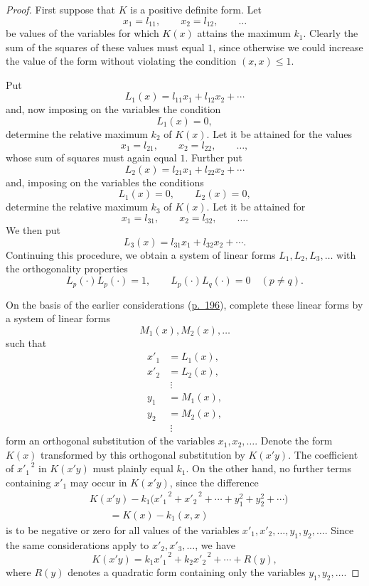 \documentclass[b5paper,twoside]{article}
\newcommand{\originalpage}[1]{\phantomsection\label{origpage:#1}}
\begin{document}
\begin{proof}
First suppose that $K$ is a positive definite form.  Let
\[
  x_1=l_{11},\qquad x_2=l_{12},\qquad\ldots
\]
be values of the variables for which $K(x)$ attains the maximum $k_1$.
Clearly the sum of the squares of these values must equal $1$, since
otherwise we could increase the value of the form without violating the
condition $(x,x)\le1$.

Put
\[
  L_1(x)=l_{11}x_1+l_{12}x_2+\cdots
\]
and, now imposing on the variables the condition
\[
  L_1(x)=0,
\]
determine the relative maximum $k_2$ of $K(x)$.  Let it be attained for the
values
\[
  x_1=l_{21},\qquad x_2=l_{22},\qquad\ldots,
\]
whose sum of squares must again equal $1$.  Further put
\[
  L_2(x)=l_{21}x_1+l_{22}x_2+\cdots
\]
and, imposing on the variables the conditions
\[
  L_1(x)=0,\qquad L_2(x)=0,
\]
determine the relative maximum $k_3$ of $K(x)$.  Let it be attained for
\[
  x_1=l_{31},\qquad x_2=l_{32},\qquad\ldots.
\]
We then put
\[
  L_3(x)=l_{31}x_1+l_{32}x_2+\cdots.
\]
Continuing this procedure, we obtain a system of linear forms
$L_1,L_2,L_3,\ldots$ with the orthogonality properties
\[
  L_p(\mathord{\cdot})L_p(\mathord{\cdot})=1,
  \qquad
  L_p(\mathord{\cdot})L_q(\mathord{\cdot})=0\quad(p\ne q).
\]

\originalpage{202}
On the basis of the earlier considerations
(\hyperref[origpage:196]{p.~196}), complete these linear forms by a system of
linear forms
\[
  M_1(x),M_2(x),\ldots
\]
such that
\[
\begin{aligned}
  x'_1&=L_1(x),\\
  x'_2&=L_2(x),\\
      &\ \vdots\\
  y_1&=M_1(x),\\
  y_2&=M_2(x),\\
     &\ \vdots
\end{aligned}
\]
form an orthogonal substitution of the variables $x_1,x_2,\ldots$.  Denote
the form $K(x)$ transformed by this orthogonal substitution by $K(x'y)$.
The coefficient of ${x'_1}^{\,2}$ in $K(x'y)$ must plainly equal $k_1$.
On the other hand, no further terms containing $x'_1$ may occur in $K(x'y)$,
since the difference
\[
\begin{aligned}
  &K(x'y)-k_1\bigl({x'_1}^{\,2}+{x'_2}^{\,2}+\cdots
                   +y_1^2+y_2^2+\cdots\bigr)\\
  &\qquad=K(x)-k_1(x,x)
\end{aligned}
\]
is to be negative or zero for all values of the variables
$x'_1,x'_2,\ldots,y_1,y_2,\ldots$.  Since the same considerations apply to
$x'_2,x'_3,\ldots$, we have
\[
  K(x'y)=k_1{x'_1}^{\,2}+k_2{x'_2}^{\,2}+\cdots+R(y),
\]
where $R(y)$ denotes a quadratic form containing only the variables
$y_1,y_2,\ldots$.


\end{proof}
\end{document}
